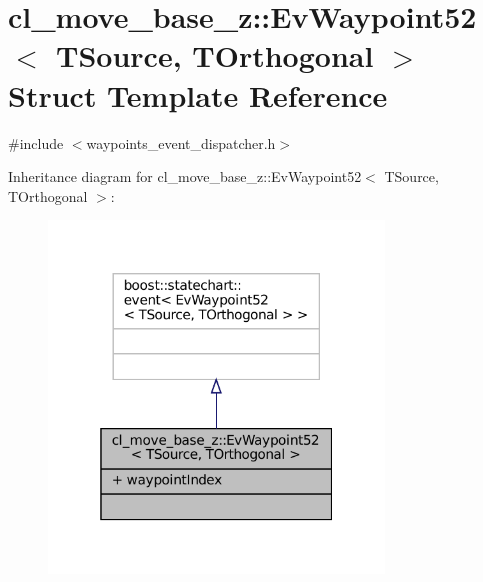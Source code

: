 \hypertarget{structcl__move__base__z_1_1EvWaypoint52}{}\section{cl\+\_\+move\+\_\+base\+\_\+z\+:\+:Ev\+Waypoint52$<$ T\+Source, T\+Orthogonal $>$ Struct Template Reference}
\label{structcl__move__base__z_1_1EvWaypoint52}


{\ttfamily \#include $<$waypoints\+\_\+event\+\_\+dispatcher.\+h$>$}



Inheritance diagram for cl\+\_\+move\+\_\+base\+\_\+z\+:\+:Ev\+Waypoint52$<$ T\+Source, T\+Orthogonal $>$\+:
\nopagebreak
\begin{figure}[H]
\begin{center}
\leavevmode
\includegraphics[width=253pt]{structcl__move__base__z_1_1EvWaypoint52__inherit__graph}
\end{center}
\end{figure}


